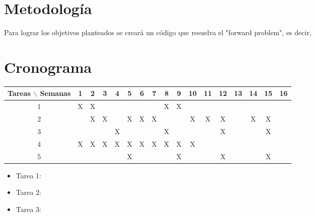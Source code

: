 \documentclass[12pt]{article}
\begin{document}
\section{Metodología}




Para lograr los objetivos planteados se creará un código que resuelva el "forward problem", es decir, 

\section{Cronograma}

\begin{table}[htb]
	\begin{tabular}{|c|cccccccccccccccc| }
	\hline
	Tareas $\backslash$ Semanas & 1 & 2 & 3 & 4 & 5 & 6 & 7 & 8 & 9 & 10 & 11 & 12 & 13 & 14 & 15 & 16  \\
	\hline
	1 & X & X &   &   &   &   &   & X & X &   &   &   &   &   &   &   \\
	2 &   & X & X &   & X & X & X &   &   & X & X & X &   & X & X &   \\
	3 &   &   &   & X &   &   &   & X &   &   &   & X &   &   & X &   \\
	4 & X & X & X & X & X & X & X & X & X & X &   &   &   &   &   &   \\
	5 &   &   &   &   & X &   &   &   & X &   &   & X &   &   & X &   \\
	\hline
	\end{tabular}
\end{table}
\vspace{1mm}

\begin{itemize}
	\item Tarea 1:
	\item Tarea 2: 
	\item Tarea 3:
\end{itemize}
\end{document}
